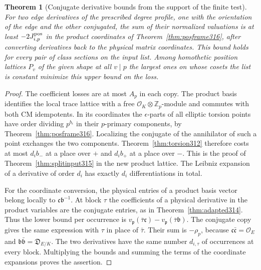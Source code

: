 \documentclass[a4paper,11pt]{article}
\newtheorem{theorem}[proposition]{Theorem}
\theoremstyle{definition}
\theoremstyle{remark}
\newcommand{\ZZ}{\mathbb Z}\newcommand{\ord}{\operatorname{ord}}
\numberwithin{equation}{section}
\newcommand{\OO}{\mathcal O}
\begin{document}
\begin{theorem}[Conjugate derivative bounds from the support of the finite test]\leavevmode
\label{thm:poscost316}
For two edge derivatives of the prescribed degree profile,
one with the orientation of the edge and the other conjugated,
the sum of their normalized valuations is at least
\(-2J^{\rm pos}_{i,p}\) in the product coordinates of
Theorem~\ref{thm:posframe316}, after converting derivatives
back to the physical matrix coordinates. This bound holds for
every pair of class sections on the input list. Among homothetic
position lattices \(P_v\) of the given shape at all \(v\mid p\)
the largest ones on whose cosets the list is constant minimize
this upper bound on the loss.
\end{theorem}
\begin{proof}
The coefficient losses are at most \(A_p\) in each copy.
The product basis identifies the local trace lattice with a
free \(\OO_K\otimes\ZZ_p\)-module and commutes with both CM
idempotents. In its coordinates the \(\epsilon\)-parts of all
elliptic torsion points have order dividing \(p^{b_\epsilon}\)
in their \(p\)-primary components, by
Theorem~\ref{thm:posframe316}. Localizing the conjugate of the
annihilator of such a point exchanges the two components.
Theorem~\ref{thm:torsion312} therefore costs at most \(d_i b_-\)
at a place over \(+\) and \(d_i b_+\) at a place over \(-\).
This is the proof of Theorem~\ref{thm:splitinput315} in the
new product lattice. The Leibniz expansion of a derivative of
order \(d_i\) has exactly \(d_i\) differentiations in total.

For the coordinate conversion, the physical entries of a product
basis vector belong locally to \(\mathfrak c\mathfrak b^{-1}\).
At block \(\tau\) the coefficients of a physical derivative in
the product variables are the conjugate entries, as in
Theorem~\ref{thm:adapted314}. Thus the lower bound per occurrence
is \(v_{\mathfrak p}(\bar\tau\mathfrak c)-
v_{\mathfrak p}(\bar\tau\mathfrak b)\). The conjugate copy gives
the same expression with \(\tau\) in place of \(\bar\tau\).
Their sum is \(-\rho_p\), because
\(\mathfrak c\bar{\mathfrak c}=\OO_E\) and
\(\mathfrak b\bar{\mathfrak b}=\mathfrak D_{E/K}\).
The two derivatives have the same number \(d_{i,\tau}\) of
occurrences at every block. Multiplying the bounds and summing
the terms of the coordinate expansions proves the assertion.


\end{proof}
\end{document}
